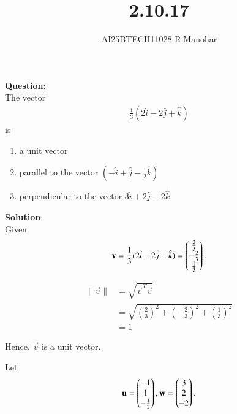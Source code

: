 \documentclass[journal]{IEEEtran}
\begin{document}

\vspace{3cm}

\title{2.10.17}
\author{AI25BTECH11028-R.Manohar}
 \maketitle
{\let\newpage\relax\maketitle}

\renewcommand{\thefigure}{\theenumi}
\renewcommand{\thetable}{\theenumi}
\setlength{\intextsep}{10pt}


\renewcommand{\thetable}{\theenumi}

\textbf{Question}:\\
The vector 
\begin{align*}
\frac{1}{3} (2\hat i - 2\hat j + \hat k)
\end{align*}
is
\begin{enumerate}
\item a unit vector
\item parallel to the vector $(-\hat i + \hat j - \frac{1}{2} \hat k)$
\item perpendicular to the vector $3 \hat i + 2 \hat j - 2 \hat k$
\end{enumerate}
\textbf{Solution}:\\
Given
\[
\mathbf v = \frac{1}{3}(2\hat i - 2\hat j + \hat k)
= \begin{pmatrix}\frac{2}{3}\\ -\frac{2}{3}\\ \frac{1}{3}\end{pmatrix}.
\]

\begin{align*}
\|\vec v\| &= \sqrt{\vec v^T \vec v} \\
&= \sqrt{\left(\frac{2}{3}\right)^2 + \left(-\frac{2}{3}\right)^2 + \left(\frac{1}{3}\right)^2} \\
&= 1
\end{align*}

Hence, $\vec v$ is a unit vector.

Let 
\[
\mathbf u = \begin{pmatrix}-1\\ 1\\ -\frac{1}{2}\end{pmatrix}, 
\mathbf w = \begin{pmatrix}3\\ 2\\ -2\end{pmatrix}.
\]
\end{document}
